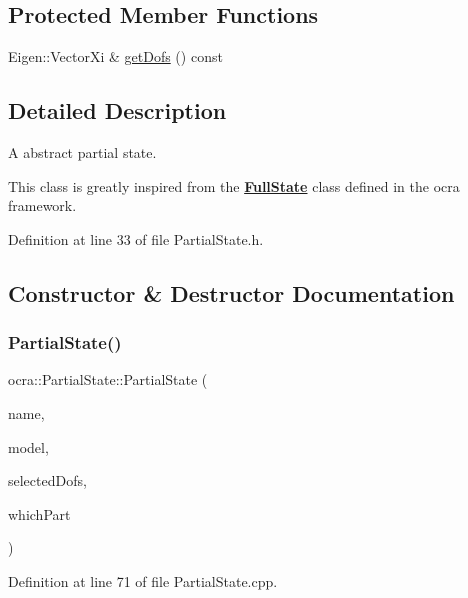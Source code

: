 \subsection*{Protected Member Functions}
\begin{DoxyCompactItemize}
\item 
Eigen\+::\+Vector\+Xi \& \hyperlink{classocra_1_1PartialState_a969bb0d941f73df7da78aba4339908c4}{get\+Dofs} () const
\end{DoxyCompactItemize}


\subsection{Detailed Description}
A abstract partial state. 

This class is greatly inspired from the {\bfseries \hyperlink{classocra_1_1FullState}{Full\+State}} class defined in the ocra framework. 

Definition at line 33 of file Partial\+State.\+h.



\subsection{Constructor \& Destructor Documentation}
\hypertarget{classocra_1_1PartialState_ab6f225c821033965da2ccd5924c23915}{}\label{classocra_1_1PartialState_ab6f225c821033965da2ccd5924c23915} 
\subsubsection{\texorpdfstring{Partial\+State()}{PartialState()}}
{\footnotesize\ttfamily ocra\+::\+Partial\+State\+::\+Partial\+State (\begin{DoxyParamCaption}\item[{const std\+::string \&}]{name,  }\item[{const Model \&}]{model,  }\item[{const Eigen\+::\+Vector\+Xi \&}]{selected\+Dofs,  }\item[{int}]{which\+Part }\end{DoxyParamCaption})}



Definition at line 71 of file Partial\+State.\+cpp.

\hypertarget{classocra_1_1PartialState_a6426dc8cd115e310f16f0d244802618f}{}\label{classocra_1_1PartialState_a6426dc8cd115e310f16f0d244802618f} 
